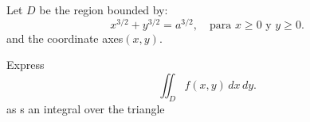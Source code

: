 Let \( D \) be the region bounded by:
\[
x^{3/2} + y^{3/2} = a^{3/2}, \quad \text{para } x \geq 0 \text{ y } y \geq 0.
\]
and the coordinate axes\( (x, y) \). 

Express \[ \iint_D f(x, y) \, dx \, dy .\] as s an integral over the
triangle
